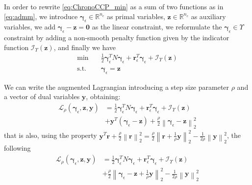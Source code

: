 \documentclass[final,3p]{elsarticle}
\newcommand{\vect}[1]{\bm{#1}}
\newcommand{\norm}[1]{\left\lVert#1\right\rVert}
\begin{document}
In order to rewrite \eqref{eq:ChronoCCP_min} as a sum of two functions as in \eqref{eq:admm}, we introduce 
$\vect{\gamma}_\epsilon \in \mathbb{R}^{n_c}$ as primal variables, 
$\vect{z} \in \mathbb{R}^{n_c}$ as auxiliary variables, 
we add $\vect{\gamma}_\epsilon - \vect{z} = \vect{0}$ as the linear constraint, 
we reformulate the $\vect{\gamma}_\epsilon \in \Upsilon$ constraint by adding a non-smooth penalty function given by the indicator function 
$\mathcal{I}_\Upsilon (\vect{z})$,
and finally we have
\begin{subequations}
	\begin{align}
    \text{min} \quad & \frac{1}{2} \vect{\gamma}_\epsilon^T N \vect{\gamma}_\epsilon + \vect{r}^T_\epsilon \vect{\gamma}_\epsilon  
		+  \mathcal{I}_\Upsilon(\vect{z})  \\
	  \text{s.t.} \quad & \vect{\gamma}_\epsilon =  \vect{z}
	\end{align}
	\label{eq:admm_mod}
\end{subequations}

We can write the augmented Lagrangian introducing a step size parameter $\rho$ and a vector of dual variables $\vect{y}$, obtaining:
\begin{align}
\mathcal{L}_{\rho} \left(\vect{\gamma}_\epsilon,\vect{z},\vect{y} \right) &= 
\frac{1}{2} \vect{\gamma}_\epsilon^T N \vect{\gamma}_\epsilon + \vect{r}^T_\epsilon \vect{\gamma}_\epsilon  
+  \mathcal{I}_\Upsilon(\vect{z}) \nonumber \\
&+ \vect{y}^T (\vect{\gamma}_\epsilon - \vect{z}) 
+ \frac{\rho}{2} \norm{\vect{\gamma}_\epsilon - \vect{z}}_2^2
\end{align}
that is also, using the property $\vect{y}^T\vect{r} + \frac{\rho}{2}\norm{\vect{r}}_2^2 = \frac{\rho}{2}\norm{\vect{r}+\frac{1}{\rho} \vect{y}}_2^2 - \frac{1}{2\rho} \norm{\vect{y}}_2^2$, the following
\begin{align}
\mathcal{L}_{\rho} \left(\vect{\gamma}_\epsilon,\vect{z},\vect{y} \right) &= 
\frac{1}{2} \vect{\gamma}_\epsilon^T N \vect{\gamma}_\epsilon + \vect{r}^T_\epsilon \vect{\gamma}_\epsilon  
+  \mathcal{I}_\Upsilon(\vect{z}) \nonumber \\
&+ \frac{\rho}{2} \norm{\vect{\gamma}_\epsilon - \vect{z} + \frac{1}{\rho} \vect{y}}_2^2
- \frac{1}{2\rho} \norm{\vect{y}}_2^2
\label{eq:augmentedlagrangian}
\end{align}
\end{document}
